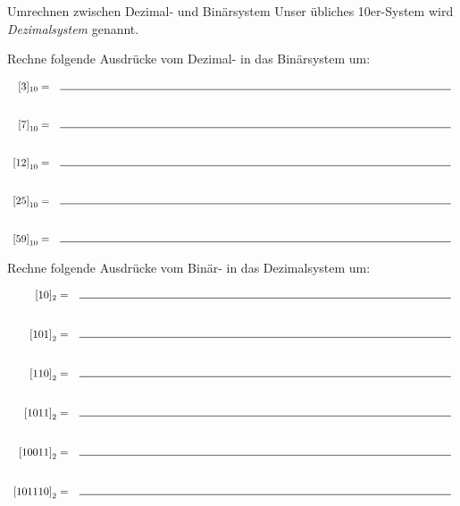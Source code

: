 \documentclass{../../../zirkelblatt}
\begin{document}
\begin{aufgabe}{Umrechnen zwischen Dezimal- und Binärsystem}
Unser übliches 10er-System wird \emph{Dezimalsystem} genannt.

Rechne folgende Ausdrücke vom Dezimal- in das Binärsystem um:

\[\begin{array}{rr}
[3]_{10} = & \rule{13cm}{0.5px}
\\\\\\
\left[ 7 \right]_{10} = & \rule{13cm}{0.5px} \\
\\\\
\left[ 12 \right]_{10} = & \rule{13cm}{0.5px} \\
\\\\
\left[ 25 \right]_{10} = & \rule{13cm}{0.5px} \\
\\\\
\left[ 59 \right]_{10} = & \rule{13cm}{0.5px}
\end{array}\]

\vspace{1cm}

Rechne folgende Ausdrücke vom Binär- in das Dezimalsystem um:

\[\begin{array}{rr}
[10]_{2} = & \rule{12cm}{0.5px}
\\\\\\
\left[ 101 \right]_{2} = & \rule{12cm}{0.5px} \\
\\\\
\left[ 110 \right]_{2} = & \rule{12cm}{0.5px} \\
\\\\
\left[ 1011 \right]_{2} = & \rule{12cm}{0.5px} \\
\\\\
\left[ 10011 \right]_{2} = & \rule{12cm}{0.5px} \\
\\\\
\left[ 101110 \right]_{2} = & \rule{12cm}{0.5px}
\end{array}\]
\end{aufgabe}
\end{document}
